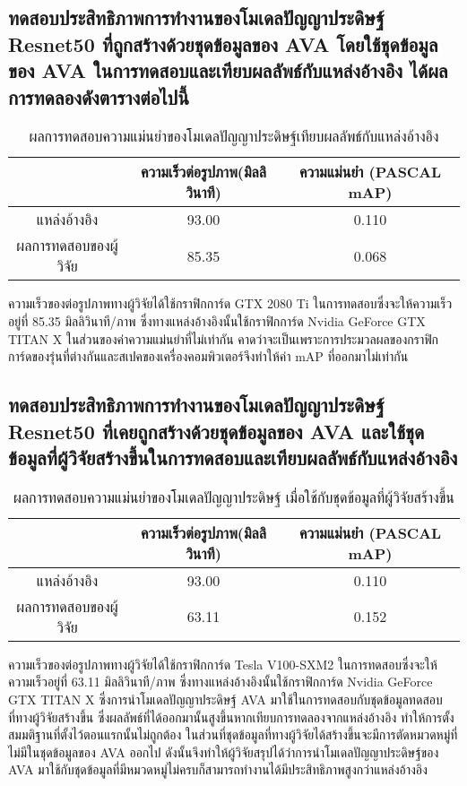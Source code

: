 \subsection{ทดสอบประสิทธิภาพการทำงานของโมเดลปัญญาประดิษฐ์ Resnet50 ที่ถูกสร้างด้วยชุดข้อมูลของ AVA โดยใช้ชุดข้อมูลของ AVA ในการทดสอบและเทียบผลลัพธ์กับแหล่งอ้างอิง ได้ผลการทดลองดังตารางต่อไปนี้}
\begin{table}[!ht]
	\centering
	\begin{tabular}{|c|c|c|}
			\hline
			{}&{ความเร็วต่อรูปภาพ(มิลลิวินาที)}&{ความแม่นยำ (PASCAL mAP)}			\\
			\hline
			แหล่งอ้างอิง	 					& 93.00		& 0.110				\\
			ผลการทดสอบของผู้วิจัย				& 85.35  	& 0.068				\\
			\hline
	\end{tabular}
\caption{ผลการทดสอบความแม่นยำของโมเดลปัญญาประดิษฐ์เทียบผลลัพธ์กับแหล่งอ้างอิง}
\label{tab: Compare PASCAL mAP with source}
\end{table}
ความเร็วของต่อรูปภาพทางผู้วิจัยได้ใช้กราฟิกการ์ด GTX 2080 Ti ในการทดสอบซึ่งจะให้ความเร็วอยู่ที่ 85.35 มิลลิวินาที/ภาพ ซึ่งทางแหล่งอ้างอิงนั้นใช้กราฟิกการ์ด Nvidia GeForce GTX TITAN X 
ในส่วนของค่าความแม่นยำที่ไม่เท่ากัน คาดว่าจะเป็นเพราะการประมวลผลของกราฟิกการ์ดของรุ่นที่ต่างกันและสเปคของเครื่องคอมพิวเตอร์จึงทำให้ค่า mAP ที่ออกมาไม่เท่ากัน

\subsection{ทดสอบประสิทธิภาพการทำงานของโมเดลปัญญาประดิษฐ์ Resnet50 ที่เคยถูกสร้างด้วยชุดข้อมูลของ AVA และใช้ชุดข้อมูลที่ผู้วิจัยสร้างขึ้นในการทดสอบและเทียบผลลัพธ์กับแหล่งอ้างอิง}
\begin{table}[!ht]
	\centering
	\begin{tabular}{|c|c|c|}
			\hline
			{}&{ความเร็วต่อรูปภาพ(มิลลิวินาที)}&{ความแม่นยำ (PASCAL mAP)}			\\
			\hline
			แหล่งอ้างอิง	 					& 93.00			& 0.110			\\
			ผลการทดสอบของผู้วิจัย				& 63.11			& 0.152			\\
			\hline
	\end{tabular}
\caption{ผลการทดสอบความแม่นยำของโมเดลปัญญาประดิษฐ์ เมื่อใช้กับชุดข้อมูลที่ผู้วิจัยสร้างขึ้น}
\label{tab: Compare PASCAL mAP with dataset created by the researcher}
\end{table}
ความเร็วของต่อรูปภาพทางผู้วิจัยได้ใช้กราฟิกการ์ด Tesla V100-SXM2 ในการทดสอบซึ่งจะให้ความเร็วอยู่ที่ 63.11 มิลลิวินาที/ภาพ ซึ่งทางแหล่งอ้างอิงนั้นใช้กราฟิกการ์ด Nvidia GeForce GTX TITAN X ซึ่งการนำโมเดลปัญญาประดิษฐ์ AVA มาใช้ในการทดสอบกับชุดข้อมูลทดสอบที่ทางผู้วิจัยสร้างขึ้น ซึ่งผลลัพธ์ที่ได้ออกมานั้นสูงขึ้นหากเทียบการทดลองจากแหล่งอ้างอิง ทำให้การตั้งสมมติฐานที่ตั้งไว้ตอนแรกนั้นไม่ถูกต้อง ในส่วนที่ชุดข้อมูลที่ทางผู้วิจัยได้สร้างขึ้นจะมีการตัดหมวดหมู่ที่ไม่มีในชุดข้อมูลของ AVA ออกไป ดังนั้นจึงทำให้ผู้วิจัยสรุปได้ว่าการนำโมเดลปัญญาประดิษฐ์ของ AVA มาใช้กับชุดข้อมูลที่มีหมวดหมู่ไม่ครบก็สามารถทำงานได้มีประสิทธิภาพสูงกว่าแหล่งอ้างอิง
\clearpage
